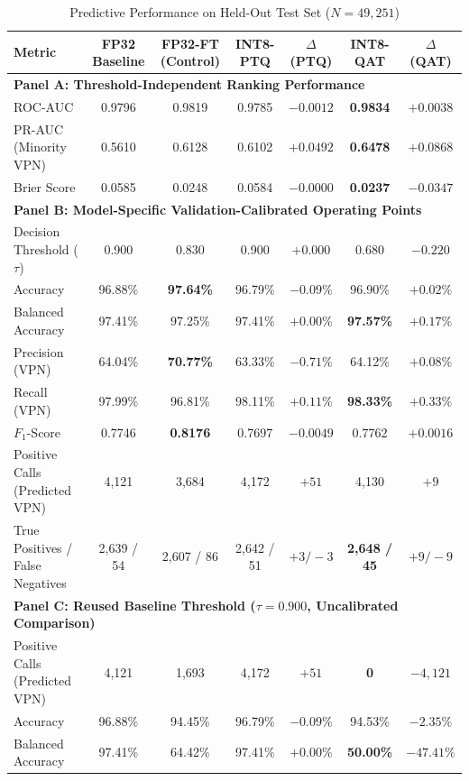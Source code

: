 \documentclass[conference]{IEEEtran}
\begin{document}
\begin{table}[htbp]
\caption{Predictive Performance on Held-Out Test Set ($N=49,251$)}
\label{tab:predictive}
\centering
\begin{tabular}{lcccccc}
\toprule
\textbf{Metric} & \textbf{FP32 Baseline} & \textbf{FP32-FT (Control)} & \textbf{INT8-PTQ} & \textbf{$\Delta$ (PTQ)} & \textbf{INT8-QAT} & \textbf{$\Delta$ (QAT)} \\
\midrule
\multicolumn{7}{l}{\textbf{Panel A: Threshold-Independent Ranking Performance}} \\
ROC-AUC & 0.9796 & 0.9819 & 0.9785 & $-0.0012$ & \textbf{0.9834} & $+0.0038$ \\
PR-AUC (Minority VPN) & 0.5610 & 0.6128 & 0.6102 & $+0.0492$ & \textbf{0.6478} & $+0.0868$ \\
Brier Score & 0.0585 & 0.0248 & 0.0584 & $-0.0000$ & \textbf{0.0237} & $-0.0347$ \\
\midrule
\multicolumn{7}{l}{\textbf{Panel B: Model-Specific Validation-Calibrated Operating Points}} \\
Decision Threshold ($\tau$) & 0.900 & 0.830 & 0.900 & $+0.000$ & 0.680 & $-0.220$ \\
Accuracy & 96.88\% & \textbf{97.64\%} & 96.79\% & $-0.09\%$ & 96.90\% & $+0.02\%$ \\
Balanced Accuracy & 97.41\% & 97.25\% & 97.41\% & $+0.00\%$ & \textbf{97.57\%} & $+0.17\%$ \\
Precision (VPN) & 64.04\% & \textbf{70.77\%} & 63.33\% & $-0.71\%$ & 64.12\% & $+0.08\%$ \\
Recall (VPN) & 97.99\% & 96.81\% & 98.11\% & $+0.11\%$ & \textbf{98.33\%} & $+0.33\%$ \\
$F_1$-Score & 0.7746 & \textbf{0.8176} & 0.7697 & $-0.0049$ & 0.7762 & $+0.0016$ \\
Positive Calls (Predicted VPN) & 4,121 & 3,684 & 4,172 & $+51$ & 4,130 & $+9$ \\
True Positives / False Negatives & 2,639 / 54 & 2,607 / 86 & 2,642 / 51 & $+3 / -3$ & \textbf{2,648 / 45} & $+9 / -9$ \\
\midrule
\multicolumn{7}{l}{\textbf{Panel C: Reused Baseline Threshold ($\tau = 0.900$, Uncalibrated Comparison)}} \\
Positive Calls (Predicted VPN) & 4,121 & 1,693 & 4,172 & $+51$ & \textbf{0} & $-4,121$ \\
Accuracy & 96.88\% & 94.45\% & 96.79\% & $-0.09\%$ & 94.53\% & $-2.35\%$ \\
Balanced Accuracy & 97.41\% & 64.42\% & 97.41\% & $+0.00\%$ & \textbf{50.00\%} & $-47.41\%$ \\

\end{tabular}
\end{table}
\end{document}
